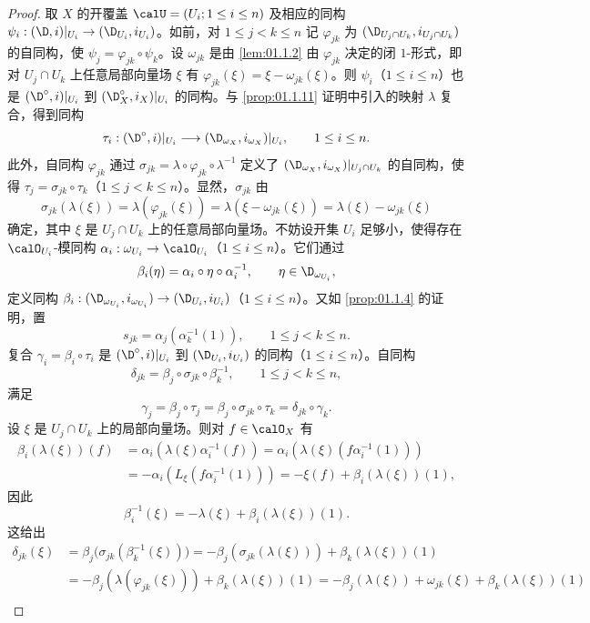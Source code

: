 \begin{proof}
取 $X$ 的开覆盖 $\calU=(U_i;1\le i\le n)$ 及相应的同构 $\psi_i:(\D,i)|_{U_i}\to(\D_{U_i},i_{U_i})$。如前，对 $1\le j<k\le n$ 记 $\varphi_{jk}$ 为 $(\D_{U_j\cap U_k},i_{U_j\cap U_k})$ 的自同构，使 $\psi_j=\varphi_{jk}\circ\psi_k$。设 $\omega_{jk}$ 是由 \ref{lem:01.1.2} 由 $\varphi_{jk}$ 决定的闭 $1$-形式，即对 $U_j\cap U_k$ 上任意局部向量场 $\xi$ 有 $\varphi_{jk}(\xi)=\xi-\omega_{jk}(\xi)$。则 $\psi_i$（$1\le i\le n$）也是 $(\D^\circ,i)|_{U_i}$ 到 $(\D_X^\circ,i_X)|_{U_i}$ 的同构。与 \ref{prop:01.1.11} 证明中引入的映射 $\lambda$ 复合，得到同构
$$\tau_i:(\D^\circ,i)|_{U_i}\longrightarrow(\D_{\omega_X},i_{\omega_X})|_{U_i},\qquad 1\le i\le n.$$
此外，自同构 $\varphi_{jk}$ 通过 $\sigma_{jk}=\lambda\circ\varphi_{jk}\circ\lambda^{-1}$ 定义了 $(\D_{\omega_X},i_{\omega_X})|_{U_j\cap U_k}$ 的自同构，使得 $\tau_j=\sigma_{jk}\circ\tau_k$（$1\le j<k\le n$）。显然，$\sigma_{jk}$ 由
$$\sigma_{jk}(\lambda(\xi))=\lambda(\varphi_{jk}(\xi))=\lambda(\xi-\omega_{jk}(\xi))=\lambda(\xi)-\omega_{jk}(\xi)$$
确定，其中 $\xi$ 是 $U_j\cap U_k$ 上的任意局部向量场。不妨设开集 $U_i$ 足够小，使得存在 $\calO_{U_i}$-模同构 $\alpha_i:\omega_{U_i}\to\calO_{U_i}$（$1\le i\le n$）。它们通过
$$\beta_i(\eta)=\alpha_i\circ\eta\circ\alpha_i^{-1},\qquad \eta\in\D_{\omega_{U_i}},$$
定义同构 $\beta_i:(\D_{\omega_{U_i}},i_{\omega_{U_i}})\to(\D_{U_i},i_{U_i})$（$1\le i\le n$）。又如 \ref{prop:01.1.4} 的证明，置
$$s_{jk}=\alpha_j(\alpha_k^{-1}(1)),\qquad 1\le j<k\le n.$$
复合 $\gamma_i=\beta_i\circ\tau_i$ 是 $(\D^\circ,i)|_{U_i}$ 到 $(\D_{U_i},i_{U_i})$ 的同构（$1\le i\le n$）。自同构
$$\delta_{jk}=\beta_j\circ\sigma_{jk}\circ\beta_k^{-1},\qquad 1\le j<k\le n,$$
满足
$$\gamma_j=\beta_j\circ\tau_j=\beta_j\circ\sigma_{jk}\circ\tau_k=\delta_{jk}\circ\gamma_k.$$
设 $\xi$ 是 $U_j\cap U_k$ 上的局部向量场。则对 $f\in\calO_X$ 有
\begin{align*}
\beta_i(\lambda(\xi))(f)&=\alpha_i(\lambda(\xi)\alpha_i^{-1}(f))=\alpha_i(\lambda(\xi)(f\alpha_i^{-1}(1)))\\
&=-\alpha_i(L_\xi(f\alpha_i^{-1}(1)))=-\xi(f)+\beta_i(\lambda(\xi))(1),
\end{align*}
因此
$$\beta_i^{-1}(\xi)=-\lambda(\xi)+\beta_i(\lambda(\xi))(1).$$
这给出
\begin{align*}
\delta_{jk}(\xi)&=\beta_j\bigl(\sigma_{jk}(\beta_k^{-1}(\xi))\bigr)=-\beta_j(\sigma_{jk}(\lambda(\xi)))+\beta_k(\lambda(\xi))(1)\\
&=-\beta_j(\lambda(\varphi_{jk}(\xi)))+\beta_k(\lambda(\xi))(1)=-\beta_j(\lambda(\xi))+\omega_{jk}(\xi)+\beta_k(\lambda(\xi))(1)\\

\end{align*}
\end{proof}

